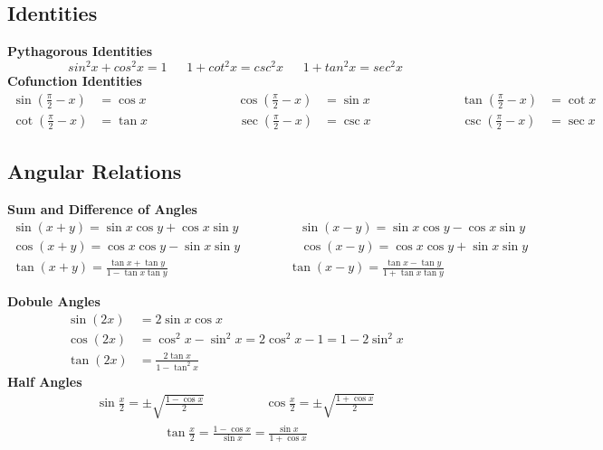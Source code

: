 \subsection{Identities}
\textbf{Pythagorous Identities}
\[sin^2x+cos^2x=1\ \ \ \ \ \ \ 1+cot^2x=csc^2x\ \ \ \ \ \ \ 1+tan^2x=sec^2x\]
\textbf{Cofunction Identities}
\begin{align*}
    \sin(\frac{\pi}{2} - x) &= \cos x\hspace{3cm}
    \cos(\frac{\pi}{2} - x) &= \sin x\hspace{3cm}
    \tan(\frac{\pi}{2} - x) &= \cot x\\
    \cot(\frac{\pi}{2} - x) &= \tan x\hspace{3cm}
    \sec(\frac{\pi}{2} - x) &= \csc x\hspace{3cm}
    \csc(\frac{\pi}{2} - x) &= \sec x
\end{align*}

\subsection{Angular Relations}
\textbf{Sum and Difference of Angles}
\begin{align*}
    \sin(x + y) = \sin x \cos y + \cos x \sin y\hspace{2cm}
    \sin(x - y) = \sin x \cos y - \cos x \sin y\\
    \cos(x + y) = \cos x \cos y - \sin x \sin y\hspace{2cm}
    \cos(x - y) = \cos x \cos y + \sin x \sin y\\
    \tan(x + y) = \frac{\tan x + \tan y}{1 - \tan x \tan y}\hspace{4cm}
    \tan(x - y) = \frac{\tan x - \tan y}{1 + \tan x \tan y}
\end{align*}

\textbf{Dobule Angles}
\begin{align*}
    \sin(2x)  &= 2 \sin x \cos x\\
    \cos(2x)  &= \cos^2 x - \sin^2 x = 2 \cos^2 x - 1 = 1 - 2 \sin^2 x\\
    \tan(2x)  &= \frac{2 \tan x}{1 - \tan^2 x}
\end{align*}
\textbf{Half Angles}
\begin{align*}
    \sin \frac{x}{2}  = \pm \sqrt{ \frac{1 - \cos x }{2} }\hspace{2cm}
    \cos \frac{x}{2}  = \pm \sqrt{ \frac{1 + \cos x }{2} }
\end{align*}
\begin{align*}
    \tan \frac{x}{2}  = \frac{1 - \cos x }{\sin x}= \frac{ \sin x }{ 1 + \cos x }
\end{align*}

